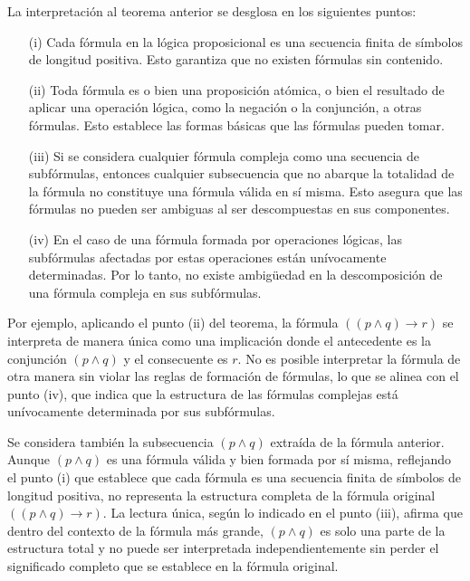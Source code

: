 \noindent
La interpretación al teorema anterior se desglosa en los siguientes puntos:
\begin{itemize}
    \item[(i)] Cada fórmula en la lógica proposicional es una secuencia finita de símbolos de longitud positiva. Esto garantiza que no existen fórmulas sin contenido.

    \item[(ii)] Toda fórmula es o bien una proposición atómica, o bien el resultado de aplicar una operación lógica, como la negación o la conjunción, a otras fórmulas. Esto establece las formas básicas que las fórmulas pueden tomar.

    \item[(iii)] Si se considera cualquier fórmula compleja como una secuencia de subfórmulas, entonces cualquier subsecuencia que no abarque la totalidad de la fórmula no constituye una fórmula válida en sí misma. Esto asegura que las fórmulas no pueden ser ambiguas al ser descompuestas en sus componentes.

    \item[(iv)] En el caso de una fórmula formada por operaciones lógicas, las subfórmulas afectadas por estas operaciones están unívocamente determinadas. Por lo tanto, no existe ambigüedad en la descomposición de una fórmula compleja en sus subfórmulas.
\end{itemize}

Por ejemplo, aplicando el punto (ii) del teorema, la fórmula $((p \land q) \rightarrow r)$ se interpreta de manera única como una implicación donde el antecedente es la conjunción $(p \land q)$ y el consecuente es $r$. No es posible interpretar la fórmula de otra manera sin violar las reglas de formación de fórmulas, lo que se alinea con el punto (iv), que indica que la estructura de las fórmulas complejas está unívocamente determinada por sus subfórmulas.

Se considera también la subsecuencia $(p \land q)$ extraída de la fórmula anterior. Aunque $(p \land q)$ es una fórmula válida y bien formada por sí misma, reflejando el punto (i) que establece que cada fórmula es una secuencia finita de símbolos de longitud positiva, no representa la estructura completa de la fórmula original $((p \land q) \rightarrow r)$. La lectura única, según lo indicado en el punto (iii), afirma que dentro del contexto de la fórmula más grande, $(p \land q)$ es solo una parte de la estructura total y no puede ser interpretada independientemente sin perder el significado completo que se establece en la fórmula original.


